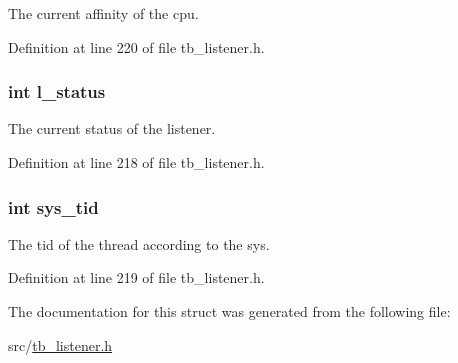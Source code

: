 The current affinity of the cpu. 



Definition at line 220 of file tb\-\_\-listener.\-h.

\hypertarget{structtb__other__info_a35fe7496a6493a097350d748cf5d8908}{
\subsubsection[{l\-\_\-status}]{\setlength{\rightskip}{0pt plus 5cm}int l\-\_\-status}}\label{structtb__other__info_a35fe7496a6493a097350d748cf5d8908}


The current status of the listener. 



Definition at line 218 of file tb\-\_\-listener.\-h.

\hypertarget{structtb__other__info_a053be2f9198a10c7329b11c19dfc6fe4}{
\subsubsection[{sys\-\_\-tid}]{\setlength{\rightskip}{0pt plus 5cm}int sys\-\_\-tid}}\label{structtb__other__info_a053be2f9198a10c7329b11c19dfc6fe4}


The tid of the thread according to the sys. 



Definition at line 219 of file tb\-\_\-listener.\-h.



The documentation for this struct was generated from the following file\-:\begin{DoxyCompactItemize}
\item 
src/\hyperlink{tb__listener_8h}{tb\-\_\-listener.\-h}\end{DoxyCompactItemize}
